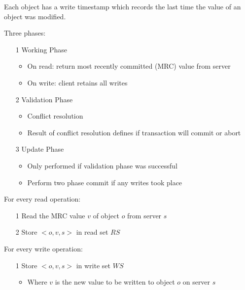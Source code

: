 \documentclass[a4paper]{article}
\begin{document}
Each object has a write timestamp which records the last time the value of an
object was modified.

Three phases:

\begin{enumerate}
  \item[1] Working Phase
    \begin{itemize}
      \item On read: return most recently committed (MRC) value from server
      \item On write: client retains all writes
    \end{itemize}

  \item[2] Validation Phase
    \begin{itemize}
      \item Conflict resolution
      \item Result of conflict resolution defines if transaction will commit or
            abort
    \end{itemize}

  \item[3] Update Phase
    \begin{itemize}
      \item Only performed if validation phase was successful
      \item Perform two phase commit if any writes took place
    \end{itemize}

\end{enumerate}


For every read operation:

\begin{enumerate}
  \item[1] Read the MRC value $v$ of object $o$ from server $s$
  \item[2] Store $<o,v,s>$ in read set $RS$
\end{enumerate}

For every write operation:

\begin{enumerate}
  \item[1] Store $<o,v,s>$ in write set $WS$
    \begin{itemize}
      \item Where $v$ is the new value to be written to object $o$ on server $s$
    \end{itemize}
\end{enumerate}
\end{document}
